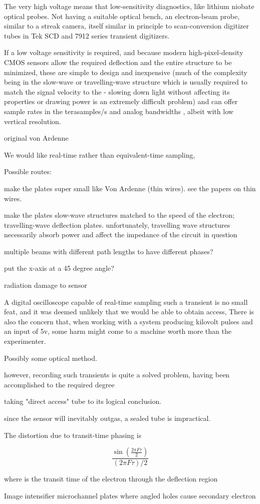 


The very high voltage means that low-sensitivity diagnostics, like lithium niobate optical probes. Not having a suitable optical bench, an electron-beam probe, similar to a streak camera, itself similar in principle to scan-conversion digitizer tubes in Tek SCD and 7912 series transient digitizers.

If a low voltage sensitivity is required, and because modern high-pixel-density CMOS sensors allow the required deflection and the entire structure to be minimized, these are simple to design and inexpensive (much of the complexity being in the slow-wave or travelling-wave structure which is usually required to match the signal velocity to the - slowing down light without affecting its properties or drawing power is an extremely difficult problem) and can offer sample rates in the terasamples/s and analog bandwidths , albeit with low vertical resolution. 

original von Ardenne 



We would like real-time rather than equivalent-time sampling, 


Possible routes:

make the plates super small like Von Ardenne (thin wires). see the papers on thin wires.

make the plates slow-wave structures matched to the speed of the electron; travelling-wave deflection plates.
unfortunately, travelling wave structures necessarily absorb power and affect the impedance of the circuit in question


multiple beams with different path lengths to have different phases?

put the x-axis at a 45 degree angle?


radiation damage to sensor 

A digital oscilloscope capable of real-time sampling such a transient is no small feat, and it was deemed unlikely that we would be 
able to obtain access, There is also the concern that, when working with a system producing kilovolt 
pulses and an input of 5v, some harm might come to a machine worth more than the experimenter.

Possibly some optical method. 

however, recording such transients is quite a solved problem, having been accomplished to the required degree 

taking "direct access" tube to its logical conclusion.

since the sensor will inevitably outgas, a sealed tube is impractical.


The distortion due to transit-time phasing is

$$ \frac{\sin(\frac{2\pi F \tau}{2})}{(2\pi F \tau)/2} $$

where \tau is the transit time of the electron through the deflection region 

Image intensifier microchannel plates where angled holes cause secondary electron 

